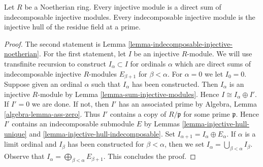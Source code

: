 \begin{proposition}
\label{proposition-structure-injectives-noetherian}
Let $R$ be a Noetherian ring.
Every injective module is a direct sum of indecomposable injective modules.
Every indecomposable injective module is the injective hull of
the residue field at a prime.
\end{proposition}

\begin{proof}
The second statement is Lemma \ref{lemma-indecomposable-injective-noetherian}.
For the first statement, let $I$ be an injective $R$-module.
We will use transfinite recursion to construct $I_\alpha \subset I$
for ordinals $\alpha$ which are direct sums of indecomposable injective
$R$-modules $E_{\beta + 1}$ for $\beta < \alpha$.
For $\alpha = 0$ we let $I_0 = 0$. Suppose given an ordinal $\alpha$
such that $I_\alpha$ has been constructed. Then $I_\alpha$ is an
injective $R$-module by Lemma \ref{lemma-sum-injective-modules}.
Hence $I \cong I_\alpha \oplus I'$. If $I' = 0$ we are done.
If not, then $I'$ has an associated prime by
Algebra, Lemma \ref{algebra-lemma-ass-zero}.
Thus $I'$ contains a copy of $R/\mathfrak p$ for some prime $\mathfrak p$.
Hence $I'$ contains an indecomposable submodule $E$ by
Lemmas \ref{lemma-injective-hull-unique} and
\ref{lemma-injective-hull-indecomposable}. Set
$I_{\alpha + 1} = I_\alpha \oplus E_\alpha$.
If $\alpha$ is a limit ordinal and $I_\beta$ has been constructed
for $\beta < \alpha$, then we set
$I_\alpha = \bigcup_{\beta < \alpha} I_\beta$.
Observe that $I_\alpha = \bigoplus_{\beta < \alpha} E_{\beta + 1}$.
This concludes the proof.
\end{proof}